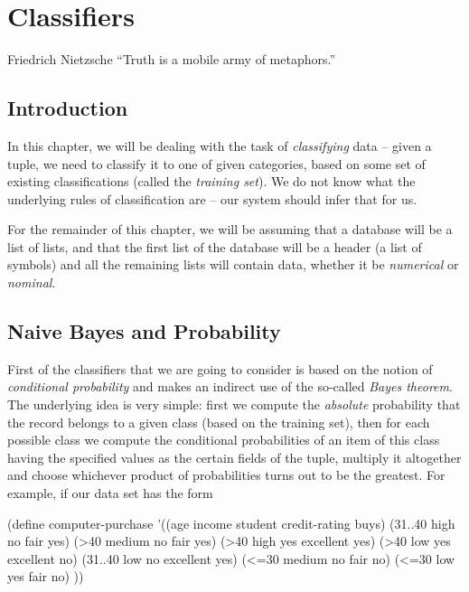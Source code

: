 \chapter{Classifiers}

\begin{chapquote}{Friedrich Nietzsche}
``Truth is a mobile army of metaphors.''
\end{chapquote}

\section{Introduction}

In this chapter, we will be dealing with the task of
\textit{classifying} data -- given a tuple, we need
to classify it to one of given categories, based
on some set of existing classifications (called the
\textit{training set}). We do not know what the
underlying rules of classification are -- our system
should infer that for us.

For the remainder of this chapter, we will be assuming
that a database will be a list of lists, and that
the first list of the database will be a header
(a list of symbols) and all the remaining lists
will contain data, whether it be \textit{numerical} or
\textit{nominal}.

\section{Naive Bayes and Probability}

First of the classifiers that we are going to consider
is based on the notion of \textit{conditional probability}
and makes an indirect use of the so-called
\textit{Bayes theorem}. The underlying idea is very simple:
first we compute the \textit{absolute} probability that
the record belongs to a given class (based on the training
set), then for each possible class we compute the conditional
probabilities of an item of this class having the specified
values as the certain fields of the tuple, multiply it
altogether and choose whichever product of probabilities
turns out to be the greatest. For example, if our data
set has the form

\begin{Snippet}
(define computer-purchase
  '((age    income student credit-rating buys)
    (31..40 high   no      fair           yes)
    (>40    medium no      fair           yes)
    (>40    high   yes     excellent      yes)
    (>40    low    yes     excellent       no)
    (31..40 low    no      excellent      yes)
    (<=30   medium no      fair            no)
    (<=30   low    yes     fair            no)
   ))
\end{Snippet}

